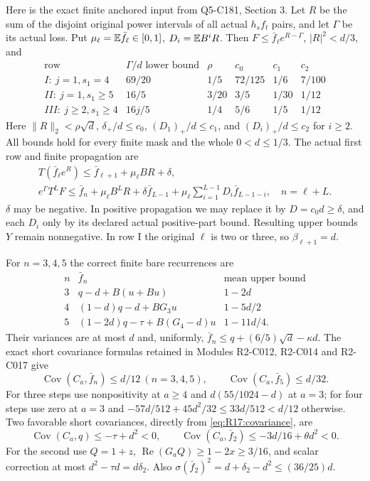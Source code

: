 Here is the exact finite anchored input from Q5-C181, Section 3.
Let $R$ be the sum of the disjoint original power intervals of all
actual $h_sf_t$ pairs, and let $\Gamma$ be its actual loss.
Put $\mu_\ell=\mathbb E\bar f_\ell\in[0,1]$, $D_i=\mathbb E B^iR$.
Then $F\le\bar f_\ell e^{R-\Gamma}$, $|R|^2<d/3$, and
\begin{equation}\tag{R20.3.table}\label{eq:R20:rows}
\begin{array}{c|ccccc}
\text{row}&\Gamma/d\text{ lower bound}&\rho&c_0&c_1&c_2\\\hline
I:\ j=1,s_1=4&69/20&1/5&72/125&1/6&7/100\\
II:\ j=1,s_1\ge5&16/5&3/20&3/5&1/30&1/12\\
III:\ j\ge2,s_1\ge4&16j/5&1/4&5/6&1/5&1/12
\end{array}
\end{equation}
Here $\|R\|_2<\rho\sqrt d$,
$\delta_+/d\le c_0$, $(D_1)_+/d\le c_1$, and
$(D_i)_+/d\le c_2$ for $i\ge2$. All bounds hold for every finite
mask and the whole $0<d\le1/3$.
The actual first row and finite propagation are
\begin{equation}\tag{R20.3.1}\label{eq:R20:propagation}
\begin{gathered}
T(\bar f_\ell e^R)\le\bar f_{\ell+1}+\mu_\ell BR+\delta,\\
e^\Gamma T^LF\le\bar f_n+\mu_\ell B^LR+\delta\bar f_{L-1}
+\mu_\ell\sum_{i=1}^{L-1}D_i\bar f_{L-1-i},\quad n=\ell+L.
\end{gathered}
\end{equation}
$\delta$ may be negative. In positive propagation we may replace it
by $D=c_0d\ge\delta$, and each $D_i$ only by its declared actual
positive-part bound. Resulting upper bounds $Y$ remain nonnegative.
In row I the original $\ell$ is two or three, so $\beta_{\ell+1}=d$.

For $n=3,4,5$ the correct finite bare recurrences are
\[
\begin{array}{c|c|c}
n&\bar f_n&\text{mean upper bound}\\\hline
3&q-d+B(u+Bu)&1-2d\\
4&(1-d)q-d+BG_3u&1-5d/2\\
5&(1-2d)q-\tau+B(G_4-d)u&1-11d/4.
\end{array}
\]
Their variances are at most $d$ and, uniformly,
$\bar f_n\le q+(6/5)\sqrt d-\kappa d$.
The exact short covariance formulas retained in Modules R2-C012,
R2-C014 and R2-C017 give
\[
\operatorname{Cov}(C_a,\bar f_n)\le d/12\ (n=3,4,5),\qquad
\operatorname{Cov}(C_a,\bar f_5)\le d/32.
\]
For three steps use nonpositivity at $a\ge4$ and
$d(55/1024-d)$ at $a=3$; for four steps use zero at $a=3$ and
$-57d/512+45d^2/32\le33d/512<d/12$ otherwise.
Two favorable short covariances, directly from
\eqref{eq:R17:covariance}, are
\begin{equation}\tag{R20.4.3}\label{eq:R20:shortcov}
\operatorname{Cov}(C_a,q)\le-\tau+d^2<0,\qquad
\operatorname{Cov}(C_a,\bar f_2)\le-3d/16+\theta d^2<0.
\end{equation}
For the second use $Q=1+z$, $\operatorname{Re}(G_aQ)\ge1-2x\ge3/16$,
and scalar correction at most $d^2-\tau d=d\delta_2$.
Also $\sigma(\bar f_2)^2=d+\delta_2-d^2\le(36/25)d$.

